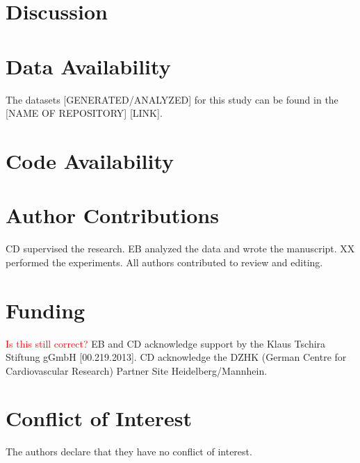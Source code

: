 \documentclass[utf8]{FrontiersinHarvard} %
\newcommand*{\red}{\textcolor{red}}
\begin{document}



\section*{Discussion}



\section*{Data Availability}
The datasets [GENERATED/ANALYZED] for this study can be found in the [NAME OF REPOSITORY] [LINK].

\section*{Code Availability}



\section*{Author Contributions}
CD supervised the research.
EB analyzed the data and wrote the manuscript. 
XX performed the experiments.
All authors contributed to review and editing.


\section*{Funding}
\red{Is this still correct?}
EB and CD acknowledge support by the Klaus Tschira Stiftung gGmbH [00.219.2013]. 
CD acknowledge the DZHK (German Centre for Cardiovascular Research) Partner Site Heidelberg/Mannhein.


\section*{Conflict of Interest}
The authors declare that they have no conflict of interest.
\end{document}
